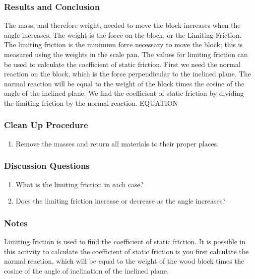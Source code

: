 \subsubsection*{Results and Conclusion}
The mass, and therefore weight, needed to move the block increases when the angle increases. The weight is the force on the block, or the Limiting Friction. The limiting friction is the minimum force necessary to move the block; this is measured using the weights in the scale pan.  
The values for limiting friction can be used to calculate the coefficient of static friction. First we need the normal reaction on the block, which is the force perpendicular to the inclined plane. The normal reaction will be equal to the weight of the block times the cosine of the angle of the inclined plane.  
We find the coefficient of static friction by dividing the limiting friction by the normal reaction.  EQUATION  

\subsubsection*{Clean Up Procedure}
\begin{enumerate}
\item{Remove the masses and return all materials to their proper places.} 
\end{enumerate}

\subsubsection*{Discussion Questions}
\begin{enumerate}
\item{What is the limiting friction in each case?}
\item{Does the limiting friction increase or decrease as the angle increases?}
\end{enumerate}

\subsubsection*{Notes}
Limiting friction is used to find the coefficient of static friction. It is possible in this activity to calculate the coefficient of static friction is you first calculate the normal reaction, which will be equal to the weight of the wood block times the cosine of the angle of inclination of the inclined plane.
